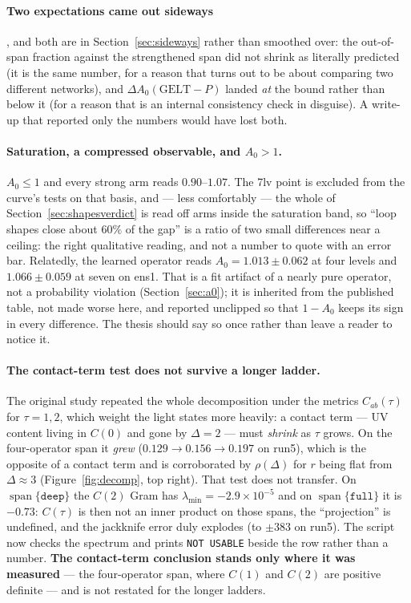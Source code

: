 \documentclass[11pt,a4paper]{article}
\newcommand{\Azero}{A_0}
\newcommand{\dAzero}{\Delta A_0}
\newcommand{\spn}{\operatorname{span}}
\newcommand{\arm}[1]{\texttt{#1}}
\begin{document}
\paragraph{Two expectations came out sideways}, and both are in
Section~\ref{sec:sideways} rather than smoothed over: the out-of-span fraction
against the strengthened span did not shrink as literally predicted (it is the
same number, for a reason that turns out to be about comparing two different
networks), and $\dAzero(\text{GELT}-P)$ landed \emph{at} the bound rather than
below it (for a reason that is an internal consistency check in disguise). A
write-up that reported only the numbers would have lost both.

\paragraph{Saturation, a compressed observable, and $\Azero > 1$.}
$\Azero \le 1$ and every strong arm reads $0.90$--$1.07$. The 7lv point is
excluded from the curve's tests on that basis, and --- less comfortably --- the
whole of Section~\ref{sec:shapesverdict} is read off arms inside the saturation
band, so ``loop shapes close about $60\%$ of the gap'' is a ratio of two small
differences near a ceiling: the right qualitative reading, and not a number to
quote with an error bar. Relatedly, the learned operator reads
$\Azero = 1.013 \pm 0.062$ at four levels and $1.066 \pm 0.059$ at seven on ens1.
That is a fit artifact of a nearly pure operator, not a probability violation
(Section~\ref{sec:a0}); it is inherited from the published table, not made worse
here, and reported unclipped so that $1 - \Azero$ keeps its sign in every
difference. The thesis should say so once rather than leave a reader to notice
it.

\paragraph{The contact-term test does not survive a longer ladder.} The original
study repeated the whole decomposition under the metrics $C_{ab}(\tau)$ for
$\tau = 1, 2$, which weight the light states more heavily: a contact term --- UV
content living in $C(0)$ and gone by $\Delta = 2$ --- must \emph{shrink} as
$\tau$ grows. On the four-operator span it \emph{grew} ($0.129 \to 0.156 \to
0.197$ on run5), which is the opposite of a contact term and is corroborated by
$\rho(\Delta)$ for $r$ being flat from $\Delta \approx 3$
(Figure~\ref{fig:decomp}, top right). That test does not transfer. On
$\spn\{\arm{deep}\}$ the $C(2)$ Gram has $\lambda_{\min} = -2.9\times10^{-5}$
and on $\spn\{\arm{full}\}$ it is $-0.73$: $C(\tau)$ is then not an inner
product on those spans, the ``projection'' is undefined, and the jackknife error
duly explodes (to $\pm 383$ on run5). The script now checks the spectrum and
prints \texttt{NOT USABLE} beside the row rather than a number. \textbf{The
contact-term conclusion stands only where it was measured} --- the four-operator
span, where $C(1)$ and $C(2)$ are positive definite --- and is not restated for
the longer ladders.
\end{document}
